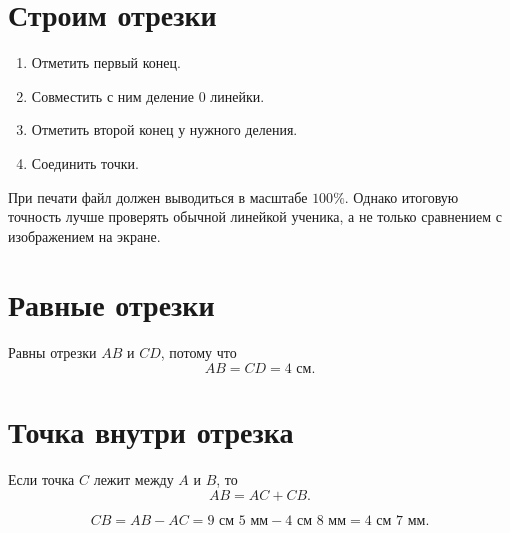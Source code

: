 \clearpage
\section{Строим отрезки}

\begin{propertybox}
  \begin{enumerate}
    \item Отметить первый конец.
    \item Совместить с ним деление \(0\) линейки.
    \item Отметить второй конец у нужного деления.
    \item Соединить точки.
  \end{enumerate}
\end{propertybox}

\studentconstructionanswersfigure

\begin{teacherbox}
  При печати файл должен выводиться в масштабе \(100\%\). Однако итоговую
  точность лучше проверять обычной линейкой ученика, а не только сравнением
  с изображением на экране.
\end{teacherbox}

\section{Равные отрезки}

\equalcontrastingsegmentsfigure

\begin{practicebox}
  Равны отрезки \(AB\) и \(CD\), потому что
  \[
    AB=CD=4\text{ см}.
  \]
\end{practicebox}

\section{Точка внутри отрезка}

\partssegmentfigure

\begin{propertybox}[Ответ]
  Если точка \(C\) лежит между \(A\) и \(B\), то
  \[
    AB=AC+CB.
  \]
\end{propertybox}

\partsproblemfigure

\begin{practicebox}
  \[
    CB=AB-AC=9\text{ см }5\text{ мм}-4\text{ см }8\text{ мм}
      =4\text{ см }7\text{ мм}.
  \]
\end{practicebox}

